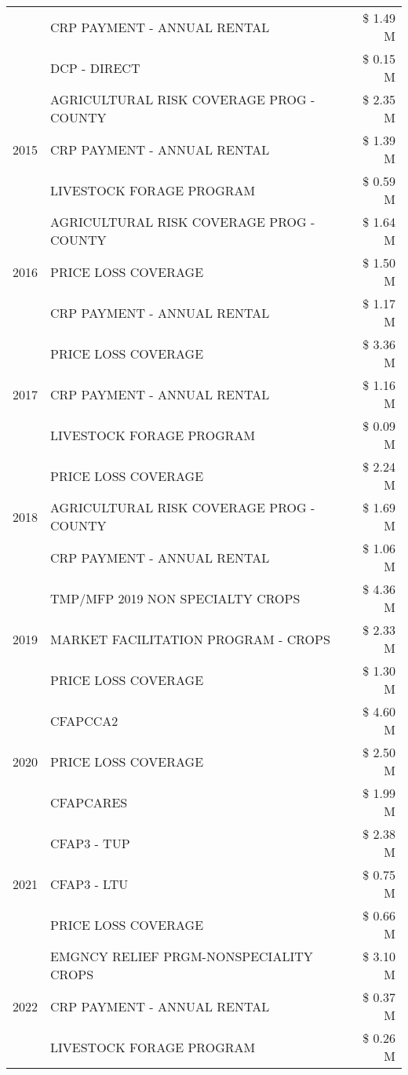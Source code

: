 \begin{tabular}{llr}
 & CRP PAYMENT - ANNUAL RENTAL & \$ 1.49 M \\
 & DCP - DIRECT & \$ 0.15 M \\
\cline{1-3}
\multirow[t]{3}{*}{2015} & AGRICULTURAL RISK COVERAGE PROG - COUNTY & \$ 2.35 M \\
 & CRP PAYMENT - ANNUAL RENTAL & \$ 1.39 M \\
 & LIVESTOCK FORAGE PROGRAM & \$ 0.59 M \\
\cline{1-3}
\multirow[t]{3}{*}{2016} & AGRICULTURAL RISK COVERAGE PROG - COUNTY & \$ 1.64 M \\
 & PRICE LOSS COVERAGE & \$ 1.50 M \\
 & CRP PAYMENT - ANNUAL RENTAL & \$ 1.17 M \\
\cline{1-3}
\multirow[t]{3}{*}{2017} & PRICE LOSS COVERAGE & \$ 3.36 M \\
 & CRP PAYMENT - ANNUAL RENTAL & \$ 1.16 M \\
 & LIVESTOCK FORAGE PROGRAM & \$ 0.09 M \\
\cline{1-3}
\multirow[t]{3}{*}{2018} & PRICE LOSS COVERAGE & \$ 2.24 M \\
 & AGRICULTURAL RISK COVERAGE PROG - COUNTY & \$ 1.69 M \\
 & CRP PAYMENT - ANNUAL RENTAL & \$ 1.06 M \\
\cline{1-3}
\multirow[t]{3}{*}{2019} & TMP/MFP 2019 NON SPECIALTY CROPS & \$ 4.36 M \\
 & MARKET FACILITATION PROGRAM - CROPS & \$ 2.33 M \\
 & PRICE LOSS COVERAGE & \$ 1.30 M \\
\cline{1-3}
\multirow[t]{3}{*}{2020} & CFAPCCA2 & \$ 4.60 M \\
 & PRICE LOSS COVERAGE & \$ 2.50 M \\
 & CFAPCARES & \$ 1.99 M \\
\cline{1-3}
\multirow[t]{3}{*}{2021} & CFAP3 - TUP & \$ 2.38 M \\
 & CFAP3 - LTU & \$ 0.75 M \\
 & PRICE LOSS COVERAGE & \$ 0.66 M \\
\cline{1-3}
\multirow[t]{3}{*}{2022} & EMGNCY RELIEF PRGM-NONSPECIALITY CROPS & \$ 3.10 M \\
 & CRP PAYMENT - ANNUAL RENTAL & \$ 0.37 M \\
 & LIVESTOCK FORAGE PROGRAM & \$ 0.26 M \\
\cline{1-3}
\bottomrule
\end{tabular}
